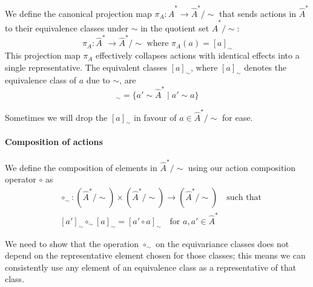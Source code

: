 We define the canonical projection map $\pi_{A}: \hat{A}^{\ast} \to \hat{A}^{\ast}/\sim$ that sends actions in $\hat{A}^{\ast}$ to their equivalence classes under $\sim$ in the quotient set $\hat{A}^{\ast}/\sim$:
\begin{equation}
	\pi_{A}: \hat{A}^{\ast} \to \hat{A}^{\ast}/\sim \text{ where } \pi_{A}(a) = [a]_{\sim}
\end{equation}
This projection map $\pi_{A}$ effectively collapses actions with identical effects into a single representative.
The equivalent classes $[a]_{\sim}$, where $[a]_{\sim}$ denotes the equivalence class of $a$ due to $\sim$, are
\begin{equation}
	[a]_{\sim} = \{ a' \sim \hat{A}^{\ast} \mid a' \sim a \}
\end{equation}



Sometimes we will drop the $[a]_{\sim}$ in favour of $a \in \hat{A}^{\ast}/\sim$ for ease.

\paragraph{Composition of actions}
We define the composition of elements in $\hat{A}^{\ast}/\sim$ using our action composition operator $\circ$ as
\begin{equation}
	\begin{aligned}
		 & \circ_{\sim}: (\hat{A}^{\ast}/\sim) \times (\hat{A}^{\ast}/\sim) \to (\hat{A}^{\ast}/\sim) \quad \text{such that} \\
		 & [a']_{\sim} \circ_{\sim} [a]_{\sim} = [a' \circ a]_{\sim} \quad \text{for $a,a' \in \hat{A}^{\ast}$}
	\end{aligned}
\end{equation}


We need to show that the operation $\circ_{\sim}$ on the equivariance classes does not depend on the representative element chosen for those classes; this means we can consistently use any element of an equivalence class as a representative of that class.

